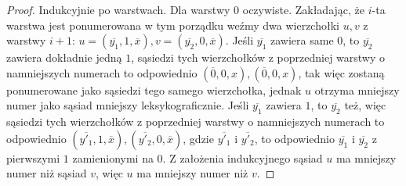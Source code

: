 \documentclass{pracamgr}
\begin{document}
  \begin{proof}
   Indukcyjnie po warstwach.\newline
   Dla warstwy $0$ oczywiste.\newline
   Zakładając, że $i$-ta warstwa jest ponumerowana w tym porządku weźmy dwa wierzchołki $u,v$ z warstwy $i+1$:
   $u=(\overline{y_1},1,\overline{x}),v=(\overline{y_2},0,\overline{x})$.\newline
   Jeśli $\overline{y_1}$ zawiera same $0$, to $\overline{y_2}$ zawiera dokładnie jedną $1$, sąsiedzi tych wierzchołków z poprzedniej warstwy
   o namniejszych numerach to odpowiednio $(\overline{0},0,x),(\overline{0},0,x)$,
   tak więc zostaną ponumerowane jako sąsiedzi tego samego wierzchołka, jednak $u$ otrzyma mniejszy numer jako sąsiad mniejszy leksykograficznie.\newline
   Jeśli $\overline{y_1}$ zawiera $1$, to $\overline{y_2}$ też, więc sąsiedzi tych wierzchołków z poprzedniej warstwy
   o namniejszych numerach to odpowiednio $(\overline{y'_1},1,\overline{x}),(\overline{y'_2},0,\overline{x})$, gdzie $\overline{y'_1}$ i $\overline{y'_2}$,
   to odpowiednio $\overline{y_1}$ i $\overline{y_2}$ z pierwszymi $1$ zamienionymi na $0$. Z założenia indukcyjnego sąsiad $u$ ma mniejszy numer niż sąsiad $v$,
   więc $u$ ma mniejszy numer niż $v$.
  \end{proof}
\end{document}
